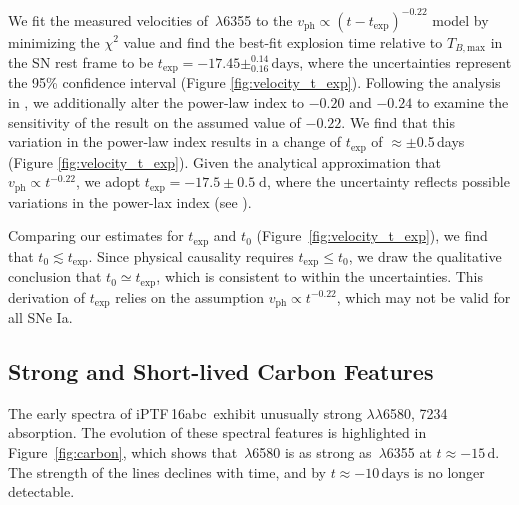 \documentclass[twocolumn]{aastex61}
\newcommand{\abc}{iPTF\,16abc}
\begin{document}
We fit the measured velocities of \,$\lambda$6355 to the
$v_\mathrm{ph}\propto(t-t_\mathrm{exp})^{-0.22}$ model by minimizing the
$\chi^2$ value and find the best-fit explosion time relative to
$T_{B,\mathrm{max}}$ in the SN rest frame to be $t_\mathrm{exp} = -17.45 \pm
^{0.14}_{0.16}\,\textrm{days}$, where the uncertainties represent the 95\%
confidence interval (Figure \ref{fig:velocity_t_exp}). Following the
analysis in \citet{2014ApJ...784...85P}, we additionally alter the power-law
index to $-0.20$ and $-0.24$ to examine the sensitivity of the result on the
assumed value of $-0.22$. We find that this variation in the power-law index
results in a change of $t_\mathrm{exp}$ of $\approx\pm$0.5\,days (Figure
\ref{fig:velocity_t_exp}). Given the analytical approximation that
$v_\mathrm{ph} \propto t^{-0.22}$, we adopt $t_\mathrm{exp} = -17.5 \pm 0.5
\; \mathrm{d}$, where the uncertainty reflects possible variations in the
power-lax index (see \citealt{2014ApJ...784...85P}).

Comparing our estimates for $t_\mathrm{exp}$ and $t_0$
(Figure~\ref{fig:velocity_t_exp}), we find that $t_0\lesssim
t_\mathrm{exp}$. Since physical causality requires $t_\mathrm{exp} \le t_0$,
we draw the qualitative conclusion that $t_0\simeq t_\mathrm{exp}$, which is
consistent to within the uncertainties. This derivation of $t_\mathrm{exp}$
relies on the assumption $v_\mathrm{ph} \propto t^{-0.22}$, which may not be
valid for all SNe Ia.

\subsection{Strong and Short-lived Carbon Features}
\label{sec:carbon}

The early spectra of \abc\ exhibit unusually strong 
$\lambda\lambda$6580, 7234 absorption. The evolution of these spectral
features is highlighted in Figure~\ref{fig:carbon}, which shows that
\,$\lambda$6580 is as strong as \,$\lambda$6355 at $t
\approx -15 \, \mathrm{d}$. The strength of the  lines declines
with time, and by $t \approx -10 \, \mathrm{days}$  is no longer
detectable.
\end{document}
